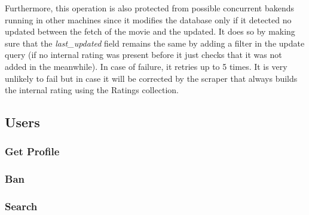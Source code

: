 \documentclass[11pt]{article}
\begin{document}
Furthermore, this operation is also protected from possible concurrent bakends running in other machines since it modifies the database only if it detected no updated between the fetch of the movie and the updated. It does so by making sure that the \emph{last\_updated} field remains the same by adding a filter in the update query (if no internal rating was present before it just checks that it was not added in the meanwhile). In case of failure, it retries up to 5 times. It is very unlikely to fail but in case it will be corrected by the scraper that always builds the internal rating using the Ratings collection.



\subsection{Users}
\subsubsection{Get Profile}

\subsubsection{Ban}

\subsubsection{Search}
\end{document}
